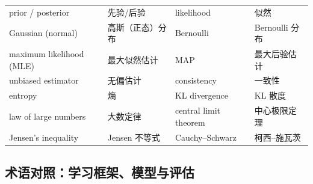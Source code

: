 \documentclass[UTF8,a4paper,11pt]{ctexart}
\theoremstyle{definition}
\theoremstyle{plain}
\theoremstyle{remark}
\begin{document}
\begin{center}
\begin{tabular}{@{}llll@{}}
prior / posterior & 先验/后验 & likelihood & 似然\\
Gaussian (normal) & 高斯（正态）分布 & Bernoulli & Bernoulli 分布\\
maximum likelihood (MLE) & 最大似然估计 & MAP & 最大后验估计\\
unbiased estimator & 无偏估计 & consistency & 一致性\\
entropy & 熵 & KL divergence & KL 散度\\
law of large numbers & 大数定律 & central limit theorem & 中心极限定理\\
Jensen's inequality & Jensen 不等式 & Cauchy--Schwarz & 柯西--施瓦茨\\
\bottomrule
\end{tabular}
\end{center}

\subsection{术语对照：学习框架、模型与评估}
\end{document}
